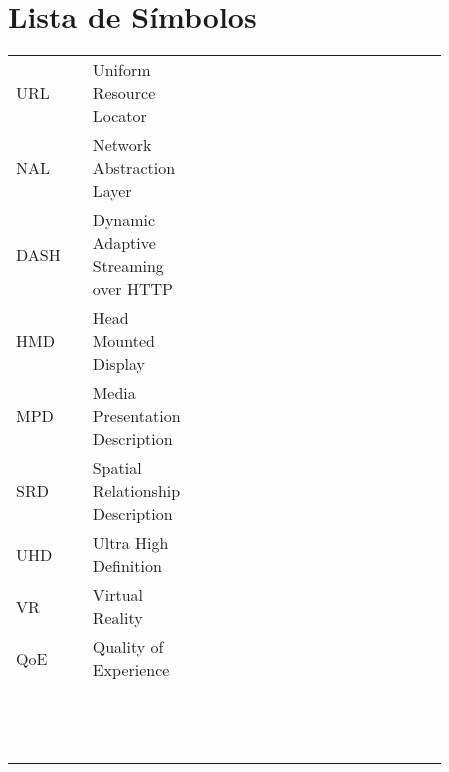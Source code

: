 \chapter*{Lista de Símbolos}

\noindent
\pagestyle{fancy}

\begin{longtable}{l l l p{0.86\linewidth}}
URL 	&   & Uniform Resource Locator & \\
NAL		& 	& Network Abstraction Layer & \\
DASH 	&  	& Dynamic Adaptive Streaming over HTTP & \\
HMD 	&  	& Head Mounted Display & \\
MPD 	&  	& Media Presentation Description & \\
SRD     & 	& Spatial Relationship Description & \\
UHD   	&  	& Ultra High Definition & \\
 VR   & 	& Virtual Reality  & \\
 QoE   &  	&  Quality of Experience & \\
    & 	 &  & \\
    & 	 &  & \\
    & 	 &  & \\
    & 	 &  & \\
    & 	 &  & \\
    & 	 &  & \\
    & 	 &  & \\
    & 	 &  & \\
    & 	 &  & \\
    & 	 &  & \\
    & 	 &  & \\
    & 	 &  & \\
    & 	 &  & \\


\end{longtable}